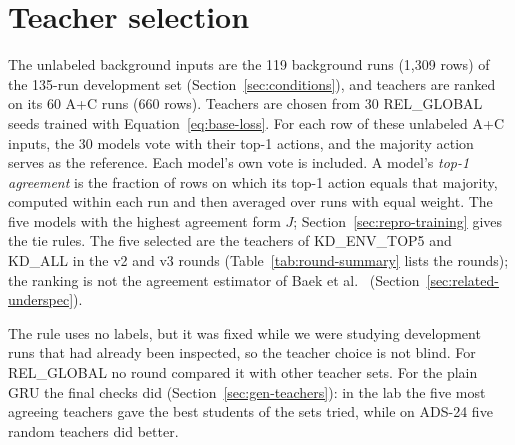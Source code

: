 

\section{Teacher selection}
\label{sec:method-teachers}

The unlabeled background inputs are the 119 background runs (1,309
rows) of the 135-run development set (Section~\ref{sec:conditions}),
and teachers are ranked on its 60 A+C runs (660 rows).
Teachers are chosen from 30 REL\_GLOBAL seeds trained with
Equation~\ref{eq:base-loss}. For each row of these unlabeled A+C inputs,
the 30 models vote with their top-1 actions, and the majority action
serves as the reference. Each model's own vote is included.
A model's
\emph{top-1 agreement} is the fraction of rows on which its top-1
action equals that majority, computed within each run and then averaged
over runs with equal weight. The five models with the highest agreement
form $J$; Section~\ref{sec:repro-training} gives the tie rules.
The five selected are the teachers of KD\_ENV\_TOP5 and KD\_ALL in
the v2 and v3 rounds (Table~\ref{tab:round-summary} lists the rounds);
the ranking is not
the agreement estimator of Baek et al.~\cite{baek2022agreement}
(Section~\ref{sec:related-underspec}).

The rule uses no labels, but it was fixed while we were studying development
runs that had already been inspected, so the teacher choice is not
blind. For REL\_GLOBAL no round compared it with other teacher sets.
For the plain GRU the final checks did (Section~\ref{sec:gen-teachers}):
in the lab the five most agreeing teachers gave the best students of the
sets tried, while on ADS-24 five random teachers did better.

